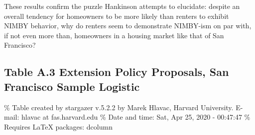 \documentclass[]{article}
\begin{document}
These results confirm the puzzle Hankinson attempts to elucidate: despite an overall tendency for homeowners to be more likely than renters to exhibit NIMBY behavior, why do renters seem to demonstrate NIMBY-ism on par with, if not even more than, homeowners in a housing market like that of San Francisco?

\hypertarget{table-a.3-extension-policy-proposals-san-francisco-sample-logistic}{%
\subsection{Table A.3 Extension Policy Proposals, San Francisco Sample Logistic}\label{table-a.3-extension-policy-proposals-san-francisco-sample-logistic}}

\% Table created by stargazer v.5.2.2 by Marek Hlavac, Harvard University. E-mail: hlavac at fas.harvard.edu
\% Date and time: Sat, Apr 25, 2020 - 00:47:47
\% Requires LaTeX packages: dcolumn
\end{document}
